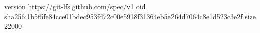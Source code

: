 version https://git-lfs.github.com/spec/v1
oid sha256:1b5f5fe84cce01bdec953fd72c00e5918f31364eb5e264d7064c8e1d523c3e2f
size 22000
